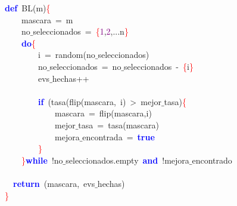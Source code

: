 \noindent
\mbox{}\textbf{\textcolor{Blue}{def}}\ BL\textcolor{BrickRed}{(}m\textcolor{BrickRed}{)}\textcolor{Red}{\{} \\
\mbox{}\ \ \ \ mascara\ \textcolor{BrickRed}{=}\ m \\
\mbox{}\ \ \ \ no$\_$seleccionados\ \textcolor{BrickRed}{=}\ \textcolor{Red}{\{}\textcolor{Purple}{1}\textcolor{BrickRed}{,}\textcolor{Purple}{2}\textcolor{BrickRed}{,...}n\textcolor{Red}{\}} \\
\mbox{}\ \ \ \ \textbf{\textcolor{Blue}{do}}\textcolor{Red}{\{} \\
\mbox{}\ \ \ \ \ \ \ \ i\ \textcolor{BrickRed}{=}\ random\textcolor{BrickRed}{(}no$\_$seleccionados\textcolor{BrickRed}{)} \\
\mbox{}\ \ \ \ \ \ \ \ no$\_$seleccionados\ \textcolor{BrickRed}{=}\ no$\_$seleccionados\ \textcolor{BrickRed}{-}\ \textcolor{Red}{\{}i\textcolor{Red}{\}} \\
\mbox{}\ \ \ \ \ \ \ \ evs$\_$hechas\textcolor{BrickRed}{++} \\
\mbox{} \\
\mbox{}\ \ \ \ \ \ \ \ \textbf{\textcolor{Blue}{if}}\ \textcolor{BrickRed}{(}tasa\textcolor{BrickRed}{(}flip\textcolor{BrickRed}{(}mascara\textcolor{BrickRed}{,}\ i\textcolor{BrickRed}{)}\ \textcolor{BrickRed}{\textgreater{}}\ mejor$\_$tasa\textcolor{BrickRed}{)}\textcolor{Red}{\{} \\
\mbox{}\ \ \ \ \ \ \ \ \ \ \ \ mascara\ \textcolor{BrickRed}{=}\ flip\textcolor{BrickRed}{(}mascara\textcolor{BrickRed}{,}i\textcolor{BrickRed}{)} \\
\mbox{}\ \ \ \ \ \ \ \ \ \ \ \ mejor$\_$tasa\ \textcolor{BrickRed}{=}\ tasa\textcolor{BrickRed}{(}mascara\textcolor{BrickRed}{)} \\
\mbox{}\ \ \ \ \ \ \ \ \ \ \ \ mejora$\_$encontrada\ \textcolor{BrickRed}{=}\ \textbf{\textcolor{Blue}{true}} \\
\mbox{}\ \ \ \ \ \ \ \ \textcolor{Red}{\}} \\
\mbox{}\ \ \ \ \textcolor{Red}{\}}\textbf{\textcolor{Blue}{while}}\ \textcolor{BrickRed}{!}no$\_$seleccionados\textcolor{BrickRed}{.}empty\ \textbf{\textcolor{Blue}{and}}\ \textcolor{BrickRed}{!}mejora$\_$encontrado \\
\mbox{} \\
\mbox{}\ \ \textbf{\textcolor{Blue}{return}}\ \textcolor{BrickRed}{(}mascara\textcolor{BrickRed}{,}\ evs$\_$hechas\textcolor{BrickRed}{)} \\
\mbox{}\textcolor{Red}{\}} \\
\mbox{}

